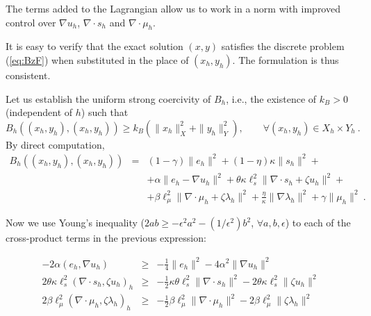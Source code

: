 \documentclass{article}
\begin{document}
\bigskip

The terms added to the Lagrangian allow us to work in a norm with improved control over $\nabla u_h$, $\nabla \cdot s_h$ and $\nabla \cdot \mu_h$.

\bigskip

 It is easy to verify that the exact solution $(x,y)$ satisfies the discrete problem (\ref{eq:BzF}) when substituted in the place of $(x_h,y_h)$. The formulation is thus consistent.

 Let us establish the uniform strong coercivity of $B_h$, i.e., the existence of $k_{B}>0$ (independent of $h$) such that
\begin{equation}
B_h((x_h,y_h),(x_h,y_h))\geq k_B \left ( \|x_h\|_X^2 + \|y_h\|_Y^2 \right ),\qquad \forall (x_h,y_h)\in X_h\times Y_h~.
\end{equation}
By direct computation, 
\begin{eqnarray}
B_h((x_h,y_h),(x_h,y_h))&=&(1-\gamma) \|e_h\|^2 + (1-\eta)\kappa \|s_h\|^2 + \nonumber \\
& & + \alpha \|e_h-\nabla u_h\|^2 + \theta \kappa \ell_s^2 \|\nabla \cdot s_h + \zeta u_h\|^2 + \nonumber \\
& & + \beta \ell_{\mu}^2 \| \nabla \cdot \mu_h + \zeta \lambda_h \|^2
+ \frac{\eta}{\kappa} \|\nabla \lambda_h\|^2 + \gamma \|\mu_h\|^2~.
\end{eqnarray}


Now we use Young's inequality ($2ab\geq -\epsilon^2 a^2-(1/\epsilon^2)b^2$, $\forall a,b, \epsilon$) to each of the cross-product terms in the previous expression:

\begin{eqnarray}
-2\alpha \left (e_h,\nabla u_h \right ) & \geq & -\frac14 \|e_h\|^2 - 4\alpha^2 \|\nabla u_h \|^2 \\
2\theta\kappa \ell_s^2\left ( \nabla \cdot s_h, \zeta u_h \right )_h& \geq & - \frac12 \kappa \theta \ell_s^2 \|\nabla\cdot s_h\|^2 - {2\theta\kappa\ell_s^2}\|\zeta u_h\|^2\\
2 \beta \ell_{\mu}^2\left ( \nabla \cdot \mu_h, \zeta \lambda_h \right )_h& \geq & - \frac12 {\beta} \ell_{\mu}^2 \|\nabla\cdot \mu_h\|^2 - {2\beta\ell_{\mu}^2}\|\zeta \lambda_h\|^2\\
\end{eqnarray}
\end{document}
